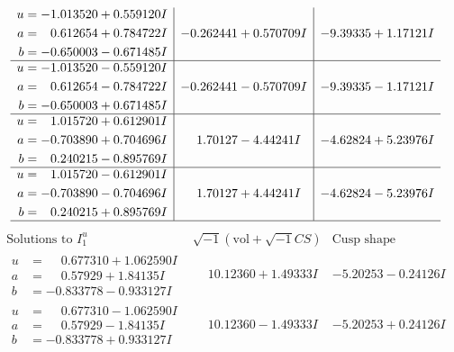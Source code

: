 \documentclass[1p]{elsarticle_modified}
\theoremstyle{definition}
\newcommand{\I}{\sqrt{-1}}
\begin{document}
$$\begin{array}{c|c|c}
\begin{aligned}
u &= -1.013520 + 0.559120 I \\
a &= \phantom{-}0.612654 + 0.784722 I \\
b &= -0.650003 - 0.671485 I\end{aligned}
 & -0.262441 + 0.570709 I & -9.39335 + 1.17121 I \\ \hline\begin{aligned}
u &= -1.013520 - 0.559120 I \\
a &= \phantom{-}0.612654 - 0.784722 I \\
b &= -0.650003 + 0.671485 I\end{aligned}
 & -0.262441 - 0.570709 I & -9.39335 - 1.17121 I \\ \hline\begin{aligned}
u &= \phantom{-}1.015720 + 0.612901 I \\
a &= -0.703890 + 0.704696 I \\
b &= \phantom{-}0.240215 - 0.895769 I\end{aligned}
 & \phantom{-}1.70127 - 4.44241 I & -4.62824 + 5.23976 I \\ \hline\begin{aligned}
u &= \phantom{-}1.015720 - 0.612901 I \\
a &= -0.703890 - 0.704696 I \\
b &= \phantom{-}0.240215 + 0.895769 I\end{aligned}
 & \phantom{-}1.70127 + 4.44241 I & -4.62824 - 5.23976 I\\
 \hline 
 \end{array}$$\newpage$$\begin{array}{c|c|c}  
\text{Solutions to }I^u_{1}& \I (\text{vol} + \sqrt{-1}CS) & \text{Cusp shape}\\
 \hline 
\begin{aligned}
u &= \phantom{-}0.677310 + 1.062590 I \\
a &= \phantom{-}0.57929 + 1.84135 I \\
b &= -0.833778 - 0.933127 I\end{aligned}
 & \phantom{-}10.12360 + 1.49333 I & -5.20253 - 0.24126 I \\ \hline\begin{aligned}
u &= \phantom{-}0.677310 - 1.062590 I \\
a &= \phantom{-}0.57929 - 1.84135 I \\
b &= -0.833778 + 0.933127 I\end{aligned}
 & \phantom{-}10.12360 - 1.49333 I & -5.20253 + 0.24126 I \\ \hline\begin{aligned}

\end{aligned}
\end{array}$$
\end{document}

